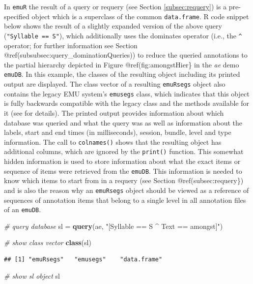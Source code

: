 \documentclass[]{book}
\newenvironment{Shaded}{\begin{snugshade}}{\end{snugshade}}
\newcommand{\CommentTok}[1]{\textcolor[rgb]{0.56,0.35,0.01}{\textit{#1}}}
\newcommand{\KeywordTok}[1]{\textcolor[rgb]{0.13,0.29,0.53}{\textbf{#1}}}
\newcommand{\NormalTok}[1]{#1}
\newcommand{\StringTok}[1]{\textcolor[rgb]{0.31,0.60,0.02}{#1}}
\begin{document}
In \texttt{emuR} the result of a query or requery (see Section \ref{subsec:requery}) is a pre-specified object which is a superclass of the common \texttt{data.frame}. R code snippet below shows the result of a slightly expanded version of the above query (\texttt{"Syllable\ ==\ S"}), which additionally uses the dominates operator (i.e., the \texttt{\^{}} operator; for further information see Section @ref(subsubsec:query\_dominationQueries)) to reduce the queried annotations to the partial hierarchy depicted in Figure @ref(fig:amongstHier\} in the \emph{ae} demo \texttt{emuDB}. In this example, the classes of the resulting object including its printed output are displayed. The class vector of a resulting \texttt{emuRsegs} object also contains the legacy EMU system's \texttt{emusegs} class, which indicates that this object is fully backwards compatible with the legacy class and the methods available for it (see \citet{harrington:2010a} for details). The printed output provides information about which database was queried and what the query was as well as information about the labels, start and end times (in milliseconds), session, bundle, level and type information. The call to \texttt{colnames()} shows that the resulting object has additional columns, which are ignored by the \texttt{print()} function. This somewhat hidden information is used to store information about what the exact items or sequence of items were retrieved from the \texttt{emuDB}. This information is needed to know which items to start from in a requery (see Section @ref(subsec:requery\}) and is also the reason why an \texttt{emuRsegs} object should be viewed as a reference of sequences of annotation items that belong to a single level in all annotation files of an \texttt{emuDB}.

\begin{Shaded}
\begin{Highlighting}[]
\CommentTok{# query database}
\NormalTok{sl =}\StringTok{ }\KeywordTok{query}\NormalTok{(ae, }\StringTok{"[Syllable == S ^ Text == amongst]"}\NormalTok{)}

\CommentTok{# show class vector}
\KeywordTok{class}\NormalTok{(sl)}
\end{Highlighting}
\end{Shaded}

\begin{verbatim}
## [1] "emuRsegs"   "emusegs"    "data.frame"
\end{verbatim}

\begin{Shaded}
\begin{Highlighting}[]
\CommentTok{# show sl object}
\NormalTok{sl}
\end{Highlighting}
\end{Shaded}
\end{document}
